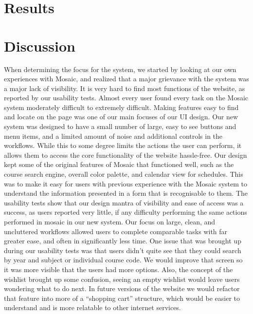 \documentclass[10pt]{article}
\begin{document}
\begin{multicols}{2}
\section*{Results}
\section*{Discussion}
When determining the focus for the system, we started by looking at our own experiences with Mosaic, and realized that a major grievance with the system was a major lack of visibility. It is very hard to find most functions of the website, as reported by our usability tests. Almost every user found every task on the Mosaic system moderately difficult to extremely difficult. Making features easy to find and locate on the page was one of our main focuses of our UI design. Our new system was designed to have a small number of large, easy to see buttons and menu items, and a limited amount of noise and additional controls in the workflows. While this to some degree limits the actions the user can perform, it allows them to access the core functionality of the website hassle-free. Our design kept some of the original features of Mosaic that functioned well, such as the course search engine, overall color palette, and calendar view for schedules. This was to make it easy for users with previous experience with the Mosaic system to understand the information presented in a form that is recognisable to them. The usability tests show that our design mantra of visibility and ease of access was a success, as users reported very little, if any difficulty performing the same actions performed in mosaic in our new system. Our focus on large, clean, and uncluttered workflows allowed users to complete comparable tasks with far greater ease, and often in significantly less time. One issue that was brought up during our usability tests was that users didn’t quite see that they could search by year and subject or individual course code. We would improve that screen so it was more visible that the users had more options. Also, the concept of the wishlist brought up some confusion, seeing an empty wishlist would leave users wondering what to do next. In future versions of the website we would refactor that feature into more of a “shopping cart” structure, which would be easier to understand and is more relatable to other internet services.

\end{multicols}
\end{document}
